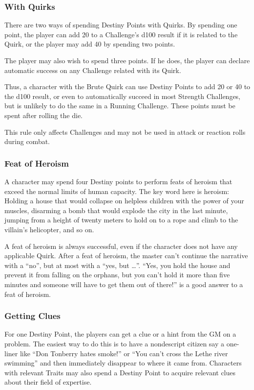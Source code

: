 \begin{multicols}{2}
\subsubsection{With Quirks}
There are two ways of spending Destiny Points with Quirks. By spending one point, the player can add 20 to a Challenge's d100 result if it is related to the Quirk, or the player may add 40 by spending two points.

The player may also wish to spend three points. If he does, the player can declare automatic success on any Challenge related with its Quirk.

Thus, a character with the Brute Quirk can use Destiny Points to add 20 or 40 to the d100 result, or even to automatically succeed in most Strength Challenges, but is unlikely to do the same in a Running Challenge. These points must be spent after rolling the die.

This rule only affects Challenges and may not be used in attack or reaction rolls during combat.

\subsubsection{Feat of Heroism}
A character may spend four Destiny points to perform feats of heroism that exceed the normal limits of human capacity. The key word here is heroism: Holding a house that would collapse on helpless children with the power of your muscles, disarming a bomb that would explode the city in the last minute, jumping from a height of twenty meters to hold on to a rope and climb to the villain’s helicopter, and so on.

A feat of heroism is always successful, even if the character does not have any applicable Quirk. After a feat of heroism, the master can’t continue the narrative with a “no”, but at most with a “yes, but \ldots”. “Yes, you hold the house and prevent it from falling on the orphans, but you can’t hold it more than five minutes and someone will have to get them out of there!” is a good answer to a feat of heroism.

\subsubsection{Getting Clues}
For one Destiny Point, the players can get a clue or a hint from the GM on a problem. The easiest way to do this is to have a nondescript citizen say a one-liner like “Don Tonberry hates smoke!” or “You can’t cross the Lethe river swimming” and then immediately disappear to where it came from. Characters with relevant Traits may also spend a Destiny Point to acquire relevant clues about their field of expertise.


\end{multicols}
